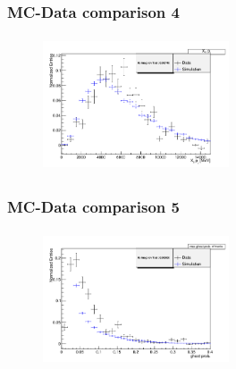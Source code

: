 \documentclass[]{beamer}
\begin{document}
\begin{frame}
\frametitle{MC-Data comparison 4}

\begin{figure}
\includegraphics[width=5.5cm,height=4.0cm]{pics/pt_Xs_comp.png}
\end{figure}

\end{frame}

\begin{frame}
\frametitle{MC-Data comparison 5}

\begin{figure}
\includegraphics[width=5.5cm,height=4.0cm]{pics/max_ghostProb_comp.png}
\end{figure}

\end{frame}
\end{document}
